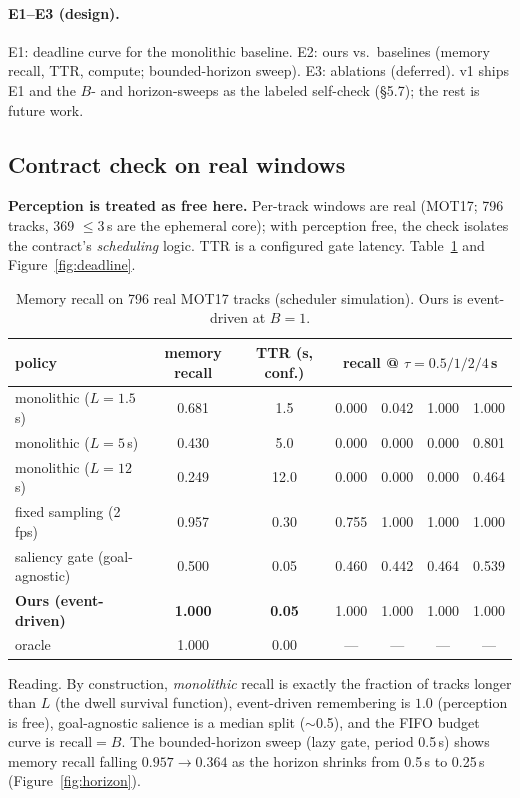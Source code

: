 \documentclass[11pt,a4paper]{article}
\begin{document}
\paragraph{E1--E3 (design).} E1: deadline curve for the monolithic baseline. E2: ours vs.\ baselines (memory recall, TTR, compute; bounded-horizon sweep). E3: ablations (deferred). v1 ships E1 and the $B$- and horizon-sweeps as the labeled self-check (\S5.7); the rest is future work.

\subsection{Contract check on real windows}
\textbf{Perception is treated as free here.} Per-track windows are real (MOT17; 796 tracks, 369 $\le 3$\,s are the ephemeral core); with perception free, the check isolates the contract's \emph{scheduling} logic. TTR is a configured gate latency. Table~\ref{tab:main} and Figure~\ref{fig:deadline}.

\begin{table}[t]\centering\small
\caption{Memory recall on 796 real MOT17 tracks (scheduler simulation). Ours is event-driven at $B{=}1$.}
\label{tab:main}
\begin{tabular}{lcc cccc}
\toprule
policy & memory recall & TTR (s, conf.) & \multicolumn{4}{c}{recall @ $\tau=0.5/1/2/4$\,s}\\
\midrule
monolithic ($L{=}1.5$\,s) & 0.681 & 1.5 & 0.000 & 0.042 & 1.000 & 1.000\\
monolithic ($L{=}5$\,s)   & 0.430 & 5.0 & 0.000 & 0.000 & 0.000 & 0.801\\
monolithic ($L{=}12$\,s)  & 0.249 & 12.0 & 0.000 & 0.000 & 0.000 & 0.464\\
fixed sampling (2\,fps)    & 0.957 & 0.30 & 0.755 & 1.000 & 1.000 & 1.000\\
saliency gate (goal-agnostic) & 0.500 & 0.05 & 0.460 & 0.442 & 0.464 & 0.539\\
\textbf{Ours (event-driven)} & \textbf{1.000} & \textbf{0.05} & 1.000 & 1.000 & 1.000 & 1.000\\
oracle & 1.000 & 0.00 & --- & --- & --- & ---\\
\bottomrule
\end{tabular}
\end{table}

Reading. By construction, \emph{monolithic} recall is exactly the fraction of tracks longer than $L$ (the dwell survival function), event-driven remembering is $1.0$ (perception is free), goal-agnostic salience is a median split ($\sim$0.5), and the FIFO budget curve is $\mathrm{recall}=B$. The bounded-horizon sweep (lazy gate, period 0.5\,s) shows memory recall falling $0.957\to0.364$ as the horizon shrinks from 0.5\,s to 0.25\,s (Figure~\ref{fig:horizon}).
\end{document}
